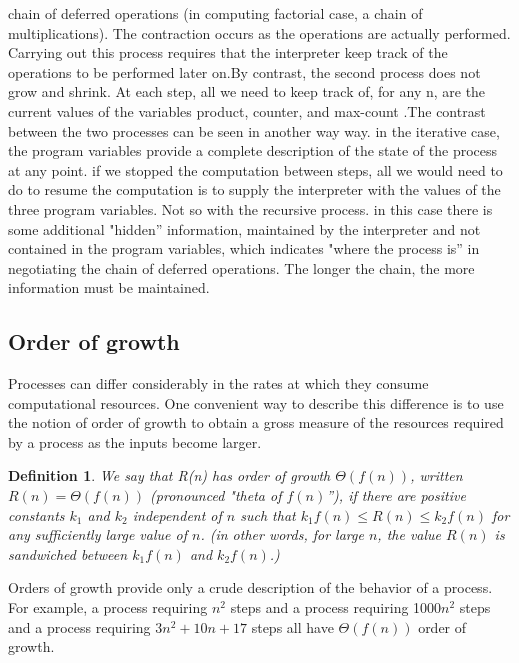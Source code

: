 \documentclass[a4paper,twoside]{article}
\newtheorem{definition}[theorem]{Definition}
\numberwithin{equation}{section}
\begin{document}
chain of deferred operations (in computing factorial case, a chain of multiplications).
The contraction occurs as the operations are actually performed. Carrying out this process requires
that the interpreter keep track of the operations to be performed later on.By contrast, the second process does not grow and shrink. At each step, all we need to keep track of, for any n, are the current values of the variables product, counter, and max-count .\newline The contrast between the two processes can be seen in another way way. in the iterative case, the program variables provide a complete description of the state of the process at any point. if we stopped the computation between steps, all we would need to do to resume the computation is to supply the interpreter with the values of the three program variables. Not so with the recursive process. in this case there is some additional "hidden” information, maintained by the interpreter and not contained in the program variables, which indicates "where the process is” in negotiating the chain of deferred operations. The longer the chain,
the more information must be maintained.
\subsection{Order of growth}
Processes can differ considerably in the rates at which they consume computational resources. One
convenient way to describe this difference is to use the notion of order of growth to obtain a gross
measure of the resources required by a process as the inputs become larger.
\begin{definition}
    We say that R(n) has order of growth $\Theta(f(n))$, written $R(n) = \Theta(f(n))$
    (pronounced "theta of $f(n)$”), if there are positive constants $k_1$ and $k_2$ independent of $n$
    such that $k_1 f(n) \leq R(n) \leq k_2 f(n)$ for any suﬃciently large value of $n$. (in other words,
    for large $n$, the value $R(n)$ is sandwiched between $k_1 f(n)$ and $k_2 f (n)$.)
\end{definition}
Orders of growth provide only a crude description of the behavior
of a process. For example, a process requiring $n^2$ steps and a process
requiring 1000$n^2$ steps and a process requiring $3n^2 + 10n + 17$ steps all have $\Theta(f(n))$ order of growth.
\end{document}
